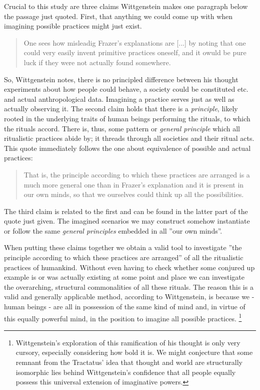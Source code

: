 \documentclass{article}
\begin{document}
Crucial to this study are three claims Wittgenstein makes one paragraph below the passage just quoted. First, that anything we could come up with when imagining possible practices might just exist.
\begin{quote}
One sees how misleadig Frazer's explanations are [...] by noting that one could very easily invent primitive practices oneself, and it owuld be pure luck if they were not actually found somewhere.
\end{quote}
So, Wittgenstein notes, there is no principled difference between his thought experiments about how people could behave, a society could be constituted etc. and actual anthropological data. Imagining a practice serves just as well as actually observing it.
The second claim holds that there is a \textit{principle}, likely rooted in the underlying traits of human beings performing the rituals, to which the rituals accord. There is, thus, some pattern or \textit{general principle} which all ritualistic practices abide by; it threads through all societies and their ritual acts. This quote immediately follows the one about equivalence of possible and actual practices:
\begin{quote}
That is, the principle according to which these practices are arranged is a much more general one than in Frazer's explanation and it is present in our own minds, so that we ourselves could think up all the possibilities.
\end{quote}
The third claim is related to the first and can be found in the latter part of the quote just given. The imagined scenarios we may construct somehow instantiate or follow the same \textit{general principles} embedded in all ''our own minds''.

When putting these claims together we obtain a valid tool to investigate ''the principle according to which these practices are arranged'' of all the ritualistic practices of humankind. Without even having to check whether some conjured up example is or was actually existing at some point and place we can investigate the overarching, structural commonalities of all these rituals. The reason this is a valid and generally applicable method, according to Wittgenstein, is because we - human beings - are all in possession of the same kind of mind and, in virtue of this equally powerful mind, in the position to imagine all possible practices.
\footnote{Wittgenstein's exploration of this ramification of his thought is only very cursory, especially considering how bold it is. We might conjecture that some remnant from the Tractatus' idea that thought and world are structurally isomorphic lies behind Wittgenstein's confidence that all people equally possess this universal extension of imaginative powers.}
\end{document}
